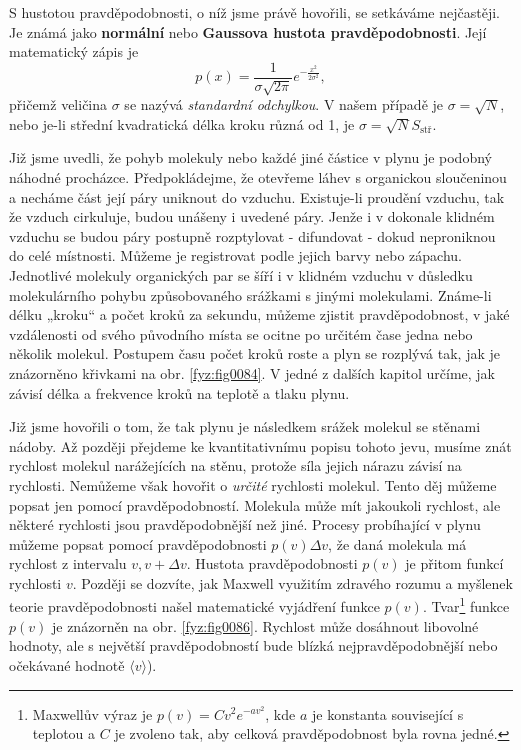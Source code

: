     S hustotou pravděpodobnosti, o níž jsme právě hovořili, se setkáváme nejčastěji. Je známá jako 
    \textbf{normální} nebo \textbf{Gaussova hustota pravděpodobnosti}. Její matematický zápis je
    \begin{equation}\label{fyz:eq091}
      p(x) = \frac{1}{\sigma\sqrt{2\pi}}e^{-\frac{x^2}{2\sigma^2}},	
    \end{equation}    
    přičemž veličina \(\sigma\) se nazývá \emph{standardní odchylkou}. V našem případě je \(\sigma 
    = \sqrt{N}\), nebo je-li střední kvadratická délka kroku různá od \num{1}, je 
    \(\sigma=\sqrt{N}S_\text{stř}\).
    
    Již jsme uvedli, že pohyb molekuly nebo každé jiné částice v plynu je podobný náhodné 
    procházce. Předpokládejme, že otevřeme láhev s organickou sloučeninou a necháme část její páry 
    uniknout do vzduchu. Existuje-li proudění vzduchu, tak že vzduch cirkuluje, budou unášeny i 
    uvedené páry. Jenže i v dokonale klidném vzduchu se budou páry postupně rozptylovat - 
    difundovat - dokud neproniknou do celé místnosti. Můžeme je registrovat podle jejich barvy nebo 
    zápachu. Jednotlivé molekuly organických par se šíří i v klidném vzduchu v důsledku 
    molekulárního pohybu způsobovaného srážkami s jinými molekulami. Známe-li délku „kroku“ a počet 
    kroků za sekundu, můžeme zjistit pravděpodobnost, v jaké vzdálenosti od svého původního místa 
    se ocitne po určitém čase jedna nebo několik molekul. Postupem času počet kroků roste a plyn se 
    rozplývá tak, jak je znázorněno křivkami na obr. \ref{fyz:fig0084}. V jedné z dalších kapitol 
    určíme, jak závisí délka a frekvence kroků na teplotě a tlaku plynu.
    
    Již jsme hovořili o tom, že tak plynu je následkem srážek molekul se stěnami nádoby. Až později 
    přejdeme ke kvantitativnímu popisu tohoto jevu, musíme znát rychlost molekul narážejících na 
    stěnu, protože síla jejich nárazu závisí na rychlosti. Nemůžeme však hovořit o \emph{určité} 
    rychlosti molekul. Tento děj můžeme popsat jen pomocí pravděpodobností. Molekula může mít 
    jakoukoli rychlost, ale některé rychlosti jsou pravděpodobnější než jiné. Procesy probíhající v 
    plynu můžeme popsat pomocí pravděpodobnosti \(p(v)\Delta v\), že daná molekula má rychlost z 
    intervalu \(v, v+ \Delta v\). Hustota pravděpodobnosti \(p(v)\) je přitom funkcí rychlosti 
    \(v\). Později se dozvíte, jak Maxwell využitím zdravého rozumu a myšlenek teorie 
    pravděpodobnosti našel matematické vyjádření funkce \(p(v)\). Tvar\footnote{Maxwellův výraz je 
    \(p(v) = Cv^2e^{-av^2}\), kde \(a\) je konstanta související s teplotou a \(C\) je zvoleno tak, 
    aby celková pravděpodobnost byla rovna jedné.} funkce \(p(v)\) je znázorněn na obr. 
    \ref{fyz:fig0086}. Rychlost může dosáhnout libovolné hodnoty, ale s největší pravděpodobností 
    bude blízká nejpravděpodobnější nebo očekávané hodnotě \(\langle v\rangle\)).
    
